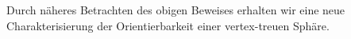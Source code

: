 \documentclass[12pt,titlepage,twoside,cleardoublepage]{article}
\theoremstyle{nummermitklammern}
\newtheorem{bemerkung}[temp]{Bemerkung}
\newtheorem{satz}[temp]{Satz}
\newtheorem{bemerkung}[zahl]{Bemerkung}
\newtheorem{satz}[zahl]{Satz}
\numberwithin{equation}{section}
\begin{document}
Durch näheres Betrachten des obigen Beweises erhalten wir eine neue Charakterisierung der Orientierbarkeit einer vertex-treuen Sphäre.

\end{document}

